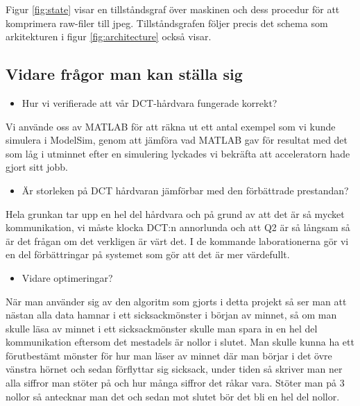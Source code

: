 \documentclass[a4paper]{article}
\begin{document}
Figur \ref{fig:state} visar en tillståndsgraf över maskinen och dess
procedur för att komprimera raw-filer till jpeg. Tillståndsgrafen följer
precis det schema som arkitekturen i figur \ref{fig:architecture} också
visar.\\

\subsection{Vidare frågor man kan ställa sig}
\begin{itemize}
	\item Hur vi verifierade att vår DCT-hårdvara fungerade korrekt?
\end{itemize}

Vi använde oss av MATLAB för att räkna ut ett antal exempel som vi kunde
simulera i ModelSim, genom att jämföra vad MATLAB gav för resultat med
det som låg i utminnet efter en simulering lyckades vi bekräfta att
acceleratorn hade gjort sitt jobb.\\

\begin{itemize}
	\item Är storleken på DCT hårdvaran jämförbar med den förbättrade prestandan?
\end{itemize}

Hela grunkan tar upp en hel del hårdvara och på grund av att det är så
mycket kommunikation, vi måste klocka DCT:n annorlunda och att Q2 är
så långsam så är det frågan om det verkligen är värt det. I de kommande
laborationerna gör vi en del förbättringar på systemet som gör att det
är mer värdefullt.\\

\begin{itemize}
	\item Vidare optimeringar?
\end{itemize}

När man använder sig av den algoritm som gjorts i detta projekt så ser
man att nästan alla data hamnar i ett sicksackmönster i början av
minnet, så om man skulle läsa av minnet i ett sicksackmönster skulle man
spara in en hel del kommunikation eftersom det mestadels är nollor i
slutet. Man skulle kunna ha ett förutbestämt mönster för hur man läser
av minnet där man börjar i det övre vänstra hörnet och sedan förflyttar
sig sicksack, under tiden så skriver man ner alla siffror man stöter på
och hur många siffror det råkar vara. Stöter man på 3 nollor så
antecknar man det och sedan mot slutet bör det bli en hel del nollor.\\
\end{document}
